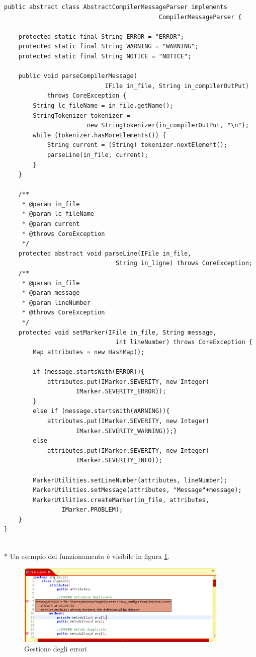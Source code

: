 \begin{lstlisting}[caption={AbstractCompilerMessageParser}, style={java}]
public abstract class AbstractCompilerMessageParser implements 
                                           CompilerMessageParser {

    protected static final String ERROR = "ERROR"; 
    protected static final String WARNING = "WARNING";
    protected static final String NOTICE = "NOTICE"; 

    public void parseCompilerMessage(
                            IFile in_file, String in_compilerOutPut)
            throws CoreException {
        String lc_fileName = in_file.getName();
        StringTokenizer tokenizer =  
                       new StringTokenizer(in_compilerOutPut, "\n"); 
        while (tokenizer.hasMoreElements()) {
            String current = (String) tokenizer.nextElement();
            parseLine(in_file, current);
        }
    }

    /**
     * @param in_file
     * @param lc_fileName
     * @param current
     * @throws CoreException
     */
    protected abstract void parseLine(IFile in_file, 
                               String in_ligne) throws CoreException;
    /**
     * @param in_file
     * @param message
     * @param lineNumber
     * @throws CoreException
     */
    protected void setMarker(IFile in_file, String message, 
                               int lineNumber) throws CoreException {
        Map attributes = new HashMap();
    
        if (message.startsWith(ERROR)){
        	attributes.put(IMarker.SEVERITY, new Integer(
                    IMarker.SEVERITY_ERROR));
        }
        else if (message.startsWith(WARNING)){
            attributes.put(IMarker.SEVERITY, new Integer(
                    IMarker.SEVERITY_WARNING));}
        else
            attributes.put(IMarker.SEVERITY, new Integer(
                    IMarker.SEVERITY_INFO));
    
        MarkerUtilities.setLineNumber(attributes, lineNumber);
        MarkerUtilities.setMessage(attributes, "Message"+message);
        MarkerUtilities.createMarker(in_file, attributes,
                IMarker.PROBLEM);
    }
}

\end{lstlisting}
\\*
Un esempio del funzionamento è visibile in figura \ref{errorieditor}.

\begin{figure}[htp]
\begin{center}
  \includegraphics[width=0.9\textwidth]{img/errori_editor.png}
  \caption[labelInTOC]{Gestione degli errori}
  \label{errorieditor} 
\end{center}
\end{figure} 


